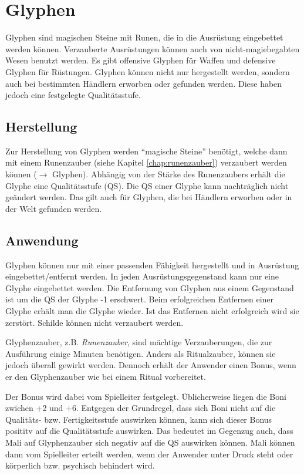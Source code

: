 {\let\clearpage\relax\chapter{Glyphen}}
\label{chap:glyphen}
Glyphen sind magischen Steine mit Runen, die in die Ausrüstung eingebettet werden können. Verzauberte Ausrüstungen können auch von nicht-magiebegabten Wesen benutzt werden. Es gibt offensive Glyphen für Waffen und defensive Glyphen für Rüstungen. Glyphen können nicht nur hergestellt werden, sondern auch bei bestimmten Händlern erworben oder gefunden werden. Diese haben jedoch eine festgelegte Qualitätsstufe.

\section{Herstellung}
Zur Herstellung von Glyphen werden "`magische Steine"' benötigt, welche dann mit einem Runenzauber (siehe Kapitel \ref{chap:runenzauber}) verzaubert werden können ($\rightarrow$ Glyphen). Abhängig von der Stärke des Runenzaubers erhält die Glyphe eine Qualitätsstufe (QS). Die QS einer Glyphe kann nachträglich nicht geändert werden. Das gilt auch für Glyphen, die bei Händlern erworben oder in der Welt gefunden werden.

\section{Anwendung}
Glyphen können nur mit einer passenden Fähigkeit hergestellt und in Ausrüstung eingebettet/entfernt werden. In jeden Ausrüstungsgegenstand kann nur eine Glyphe eingebettet werden. Die Entfernung von Glyphen aus einem Gegenstand ist um die QS der Glyphe -1 erschwert. Beim erfolgreichen Entfernen einer Glyphe erhält man die Glyphe wieder. Ist das Entfernen nicht erfolgreich wird sie zerstört. Schilde können nicht verzaubert werden.

Glyphenzauber, z.B. \textit{Runenzauber}, sind mächtige Verzauberungen, die zur Ausführung einige Minuten benötigen. Anders als Ritualzauber, können sie jedoch überall gewirkt werden. Dennoch erhält der Anwender einen Bonus, wenn er den Glyphenzauber wie bei einem Ritual vorbereitet. 

Der Bonus wird dabei vom Spielleiter festgelegt. Üblicherweise liegen die Boni zwichen +2 und +6. Entgegen der Grundregel, dass sich Boni nicht auf die Qualitäts- bzw. Fertigkeitsstufe auswirken können, kann sich dieser Bonus posititv auf die Qualitätsstufe auswirken. Das bedeutet im Gegenzug auch, dass Mali auf Glyphenzauber sich negativ auf die QS auswirken können. Mali können dann vom Spielleiter erteilt werden, wenn der Anwender unter Druck steht oder körperlich bzw. psychisch behindert wird.

